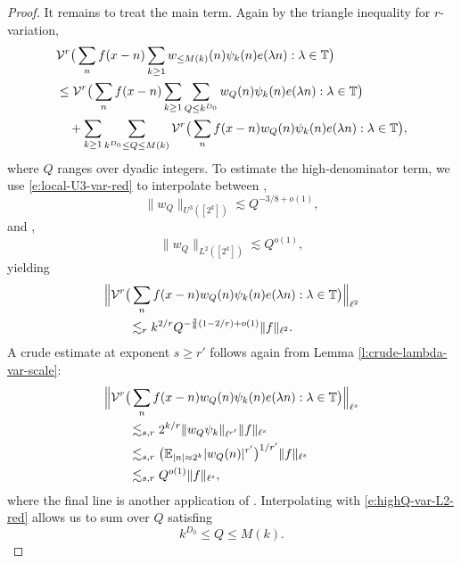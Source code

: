 \documentclass[12pt]{amsart}
\numberwithin{equation}{section}
\theoremstyle{definition}
\begin{document}
\begin{proof}
It remains to treat the main term. Again by the triangle inequality for \(r\)-variation,
\begin{align}
    &\mathcal{V}^r\big(
    \sum_n f(x-n)\sum_{k \geq 1} w_{\leq M(k)}(n)\psi_k(n)e(\lambda n):
    \lambda\in\mathbb T
    \big)
    \notag\\
    &\leq
    \mathcal{V}^r\big(
    \sum_n f(x-n)\sum_{k \geq 1}\sum_{Q\leq k^{D_0}}
    w_Q(n)\psi_k(n)e(\lambda n):
    \lambda\in\mathbb T
    \big)
    \notag\\
    &\quad+
    \sum_{k \geq 1}\sum_{k^{D_0}\leq Q\leq M(k)}
    \mathcal{V}^r\big(
    \sum_n f(x-n)w_Q(n)\psi_k(n)e(\lambda n):
    \lambda\in\mathbb T
    \big),
\end{align}
where \(Q\) ranges over dyadic integers. To estimate the high-denominator term, we use \eqref{e:local-U3-var-red} to interpolate between \cite[Proposition 2.1]{F+},
\[
    \|w_Q\|_{U^3([2^k])}
    \lesssim Q^{-3/8+o(1)},
\]
and \cite[Lemma 3.1]{FKT1},
\[
    \|w_Q\|_{L^2([2^k])}\lesssim Q^{o(1)},
\]
yielding
\begin{align}\label{e:highQ-var-L2-red}
    &\Big\|
    \mathcal{V}^r\big(
    \sum_n f(x-n)w_Q(n)\psi_k(n)e(\lambda n):
    \lambda\in\mathbb T
    \big)
    \Big\|_{\ell^2}
    \notag\\
    &\qquad\lesssim_r
    k^{2/r}
    Q^{-\frac38(1-2/r)+o(1)}
    \|f\|_{\ell^2}.
\end{align}
A crude estimate at exponent \(s \geq r'\) follows again from Lemma
\ref{l:crude-lambda-var-scale}:
\begin{align}
    &\Big\|
    \mathcal{V}^r\big(
    \sum_n f(x-n)w_Q(n)\psi_k(n)e(\lambda n):
    \lambda\in\mathbb T
    \big)
    \Big\|_{\ell^s}
    \notag\\
    &\qquad\lesssim_{s,r}
    2^{k/r}\|w_Q\psi_k\|_{\ell^{r'}}\|f\|_{\ell^s}
    \notag\\
    &\qquad\lesssim_{s,r}
    \big(
    \mathbb E_{|n|\approx 2^k}|w_Q(n)|^{r'}
    \big)^{1/r'}
    \|f\|_{\ell^s}
    \notag\\
    &\qquad\lesssim_{s,r}
    Q^{o(1)}\|f\|_{\ell^s},
\end{align}
where the final line is another application of \cite[Lemma 3.1]{FKT1}.  Interpolating
with \eqref{e:highQ-var-L2-red} allows us to sum over $Q$ satisfing
\[ k^{D_0} \leq Q \leq M(k).\]


\end{proof}
\end{document}
